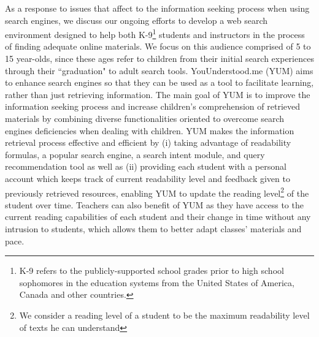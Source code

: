 \documentclass{sig-alternate-05-2015}
\begin{document}
As a response to issues that affect to the information seeking process when using search engines,  we  discuss our ongoing efforts to develop a web search environment designed to help both K-9\footnote{ K-9 refers to the publicly-supported school grades prior to high school sophomores in the education systems from the United States of America, Canada and other countries.} students and instructors in the process of finding adequate online materials. We focus on this audience comprised of 5 to 15 year-olds, since these ages refer to children from their initial search experiences through their ``graduation" to adult search tools. YouUnderstood.me (YUM) aims to enhance search engines so that they can be used as a tool to facilitate learning, rather than just retrieving information. The main goal of YUM is to improve the information seeking process and increase children's comprehension of retrieved materials by combining diverse functionalities oriented to overcome search engines deficiencies when dealing with children. YUM makes the information retrieval process effective and efficient by (i) taking advantage of readability formulas, a popular search engine, a search intent module, and query recommendation tool as well as (ii) providing each student with a personal account which keeps track of current readability level and feedback given to previously retrieved resources, enabling YUM to update the  reading level\footnote{We consider a reading level of a student to be the maximum readability level of texts he can understand} of the student over time.  Teachers can also benefit of YUM  as they have access to the current reading capabilities of each student and their change in time without any intrusion to students, which allows them to better adapt classes' materials and pace. 
\end{document}
